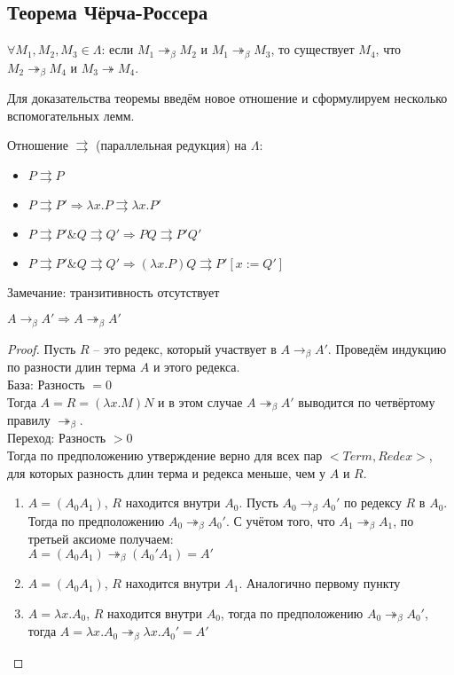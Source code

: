 \subsection{Теорема Чёрча-Россера}
\label{sec-2-4}
\begin{theorem}
$\forall M_1, M_2, M_3 \in \Lambda$:
если $M_1 \twoheadrightarrow_\beta M_2$ и $M_1 \twoheadrightarrow_\beta M_3$,
то существует $M_4$, что $M_2 \twoheadrightarrow_\beta M_4$ и $M_3
\twoheadrightarrow M_4$.
\end{theorem}
Для доказательства теоремы введём новое отношение и сформулируем несколько
вспомогательных лемм.
\begin{definition}
Отношение $\rightrightarrows$ (параллельная редукция) на $\Lambda$:
\begin{itemize}
\item $P \rightrightarrows P$
\item $P \rightrightarrows P' \Rightarrow \lambda x . P \rightrightarrows
\lambda x . P'$
\item $P \rightrightarrows P' \& Q \rightrightarrows Q' \Rightarrow
P Q \rightrightarrows P' Q'$
\item $P \rightrightarrows P' \& Q \rightrightarrows Q' \Rightarrow
(\lambda x . P) Q \rightrightarrows P'[x:=Q']$
\end{itemize}
Замечание: транзитивность отсутствует
\end{definition}
\begin{lemma}
$A \to_\beta A' \Rightarrow A \twoheadrightarrow_\beta A'$
\end{lemma}
\begin{proof}
Пусть $R$ -- это редекс, который участвует в $A \to_\beta A'$. Проведём индукцию
по разности длин терма $A$ и этого редекса. \\
База: Разность $= 0$ \\
Тогда $A = R = (\lambda x . M) N$ и в этом случае $A \twoheadrightarrow_\beta
A'$ выводится по четвёртому правилу $\twoheadrightarrow_\beta$. \\
Переход: Разность $> 0$ \\
Тогда по предположению утверждение верно для всех пар $<Term, Redex>$, 
для которых разность длин терма и редекса меньше, чем у $A$ и $R$.
\begin{enumerate}
\item $A = (A_0 A_1)$, $R$ находится внутри $A_0$. Пусть $A_0 \to_\beta A_0'$
по редексу $R$ в $A_0$. Тогда по предположению $A_0 \twoheadrightarrow_\beta A_0'$.
С учётом того, что $A_1 \twoheadrightarrow_\beta A_1$, по третьей аксиоме
получаем: \\
$A = (A_0 A_1) \twoheadrightarrow_\beta (A_0' A_1) = A'$
\item $A = (A_0 A_1)$, $R$ находится внутри $A_1$. Аналогично первому пункту
\item $A = \lambda x . A_0$, $R$ находится внутри $A_0$, тогда по предположению
$A_0 \twoheadrightarrow_\beta A_0'$, тогда $A = \lambda x . A_0 
\twoheadrightarrow_\beta \lambda x . A_0' = A'$
\end{enumerate}
\end{proof}